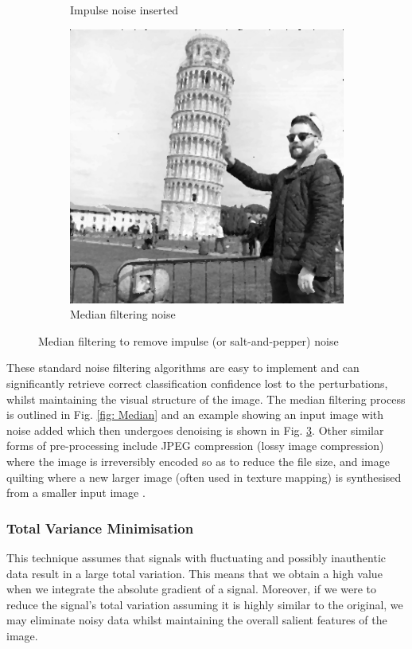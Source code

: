 \begin{figure}[h!]
\begin{subfigure}{.3\textwidth}
		\caption{Impulse noise inserted}
		\label{fig: LAPLAR2}
	\end{subfigure}
	\begin{subfigure}{.3\textwidth}
		\includegraphics[width=\textwidth]{Ifiltered.png}
		\caption{Median filtering noise}
		\label{fig: LAPLAR3}
	\end{subfigure}
	\caption{Median filtering to remove impulse (or salt-and-pepper) noise}
	\label{fig: MedianBeforeAfter}
\end{figure}
These standard noise filtering algorithms are easy to implement and can significantly retrieve correct classification confidence lost to the perturbations, whilst maintaining the visual structure of the image. The median filtering process is outlined in Fig. \ref{fig: Median} and an example showing an input image with noise added which then undergoes denoising is shown in Fig. \ref{fig: MedianBeforeAfter}. Other similar forms of pre-processing include JPEG compression (lossy image compression) where the image is irreversibly encoded so as to reduce the file size, and image quilting where a new larger image (often used in texture mapping) is synthesised from a smaller input image \cite{efros2001image}.



\subsubsection{Total Variance Minimisation}
This technique assumes that signals with fluctuating and possibly inauthentic data result in a large total variation. This means that  we obtain a high value when we integrate the absolute gradient of a signal. Moreover, if we were to reduce the signal’s total variation assuming it is highly similar to the original, we may eliminate noisy data whilst maintaining the overall salient features of the image.



